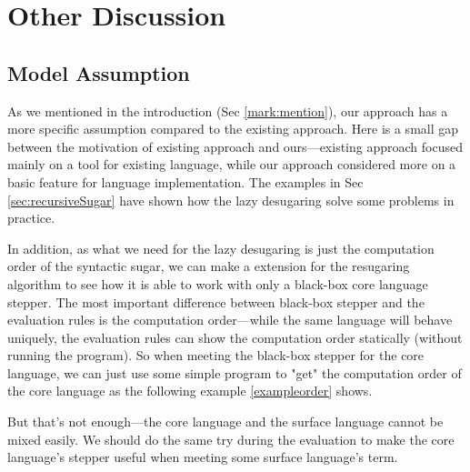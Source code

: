 \section{Other Discussion}
\label{sec5}

\subsection{Model Assumption}
\label{sec5.1}


As we mentioned in the introduction (Sec \ref{mark:mention}), our approach has a more specific assumption compared to the existing approach. Here is a small gap between the motivation of existing approach and ours---existing approach focused mainly on a tool for existing language, while our approach considered more on a basic feature for language implementation. The examples in Sec \ref{sec:recursiveSugar} have shown how the lazy desugaring solve some problems in practice.

In addition, as what we need for the lazy desugaring is just the computation order of the syntactic sugar, we can make a extension for the resugaring algorithm to see how it is able to work with only a black-box core language stepper. The most important difference between black-box stepper and the evaluation rules is the computation order---while the same language will behave uniquely, the evaluation rules can show the computation order statically (without running the program). So when meeting the black-box stepper for the core language, we can just use some simple program to "get" the computation order of the core language as the following example \ref{exampleorder} shows.



But that's not enough---the core language and the surface language cannot be mixed easily. We should do the same try during the evaluation to make the core language's stepper useful when meeting some surface language's term.

